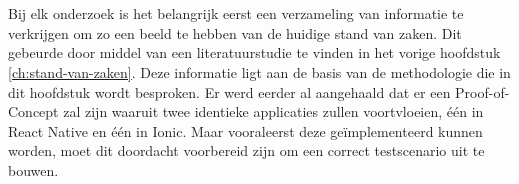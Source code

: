
\chapter{}%
\label{ch:methodologie}


Bij elk onderzoek is het belangrijk eerst een verzameling van informatie te verkrijgen om zo een beeld te hebben van de huidige stand van zaken. Dit gebeurde door middel van een literatuurstudie te vinden in het vorige hoofdstuk \ref{ch:stand-van-zaken}. Deze informatie ligt aan de basis van de methodologie die in dit hoofdstuk wordt besproken. Er werd eerder al aangehaald dat er een Proof-of-Concept zal zijn waaruit twee identieke applicaties zullen voortvloeien, één in React Native en één in Ionic. Maar vooraleerst deze geïmplementeerd kunnen worden, moet dit doordacht voorbereid zijn om een correct testscenario uit te bouwen.

\section{}%
\label{sec:requirements-analyse}


